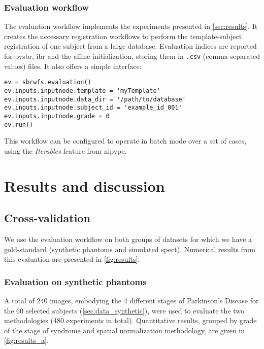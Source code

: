 \documentclass{frontiers}
\begin{document}
\subsubsection{Evaluation workflow} %
The evaluation workflow implements the experiments presented in \autoref{sec:results}. 
It creates the necessary registration workflows to perform the template-subject 
  registration of one subject from a large database.
Evaluation indices are reported for \gls*{pysbr}, \gls*{ibr} and the affine initialization,
  storing them in \texttt{.csv} (comma-separated values) files. 
It also offers a simple interface:
\begin{lstlisting}[float,caption={\label{list:fullev}Running the evaluation pipeline}]
ev = sbrwfs.evaluation()
ev.inputs.inputnode.template = 'myTemplate'
ev.inputs.inputnode.data_dir = '/path/to/database'
ev.inputs.inputnode.subject_id = 'example_id_001'
ev.inputs.inputnode.grade = 0
ev.run()
\end{lstlisting}

\noindent 
This workflow can be configured to operate in batch mode over a
  set of cases, using the \emph{Iterables} feature from \gls*{nipype}.

\section{Results and discussion}
\label{sec:results}

\subsection{Cross-validation}
\label{sec:results_test}
We use the evaluation workflow on both groups of datasets
  for which we have a gold-standard (synthetic phantoms and simulated \gls*{spect}).
Numerical results from this evaluation are presented in \autoref{fig:results}.


\subsubsection{Evaluation on synthetic phantoms}
\label{sec:results_phantoms}
A total of 240 images, embodying the 4 different stages
  of Parkinson's Disease for the 60 selected subjects
  (\autoref{sec:data_synthetic}), were used to evaluate
  the two methodologies (480 experiments in total).
Quantitative results, grouped by grade of the stage of
  syndrome and spatial normalization methodology, 
  are given in \autoref{fig:results_a}.
\end{document}
